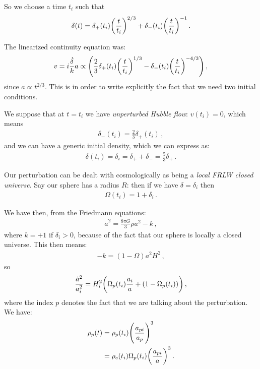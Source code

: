 \documentclass[main.tex]{subfiles}
\begin{document}
So we choose a time \(t_i\) such that 
%
\begin{align}
\delta (t) = \delta_+ (t_i) \qty(\frac{t}{t_i})^{2/3}
+ \delta_- (t_i) \qty(\frac{t}{t_i})^{-1}
\,.
\end{align}

The linearized continuity equation was: 
%
\begin{align}
v = i \frac{ \dot{\delta}}{k} a 
\propto \qty(\frac{2}{3} \delta_{+} (t_i) \qty(\frac{t}{t_i})^{1/3} - \delta_{-} (t_i) \qty(\frac{t}{t_i})^{-4/3})
\,,
\end{align}
%
since \(a \propto t^{2/3}\). This is in order to write explicitly the fact that we need two initial conditions. 

We suppose that at \(t=t_i\) we have \emph{unperturbed Hubble flow}: \(v(t_i) = 0\), which means 
%
\begin{align}
\delta_{-} (t_i) = \frac{2}{3} \delta_{+}(t_i)
\,,
\end{align}
%
and we can have a generic initial density, which we can express as: 
%
\begin{align}
\delta (t_i) = \delta_{i} = \delta_{+} + \delta_{-} = \frac{5}{3} \delta_{+} 
\,.
\end{align}

Our perturbation can be dealt with cosmologically as being a \emph{local FRLW closed universe}. 
Say our sphere has a radius \(R\): then if we have \( \delta = \delta_i\) then 
%
\begin{align}
\Omega (t_i) = 1 + \delta_{i}
\,.
\end{align}

We have then, from the Friedmann equations: 
%
\begin{align}
\dot{a}^2 = \frac{8 \pi G}{3} \rho a^2 - k 
\,,
\end{align}
%
where \(k = +1\) if \(\delta_{i} > 0\), because of the fact that our sphere is locally a closed universe. 
This then means: 
%
\begin{align}
- k = (1 - \Omega ) a^2 H^2
\,,
\end{align}
%
so 
%
\begin{align}
\frac{\dot{a}^2 }{a_i^2} = H_i^2 \qty(
    \Omega_{p} (t_i) \frac{a_i}{a} + (1 - \Omega_{p}(t_i))
)
\,,
\end{align}
%
where the index \(p\) denotes the fact that we are talking about the perturbation. We have: 
%
\begin{subequations}
\begin{align}
\rho_{p} (t) &= \rho_{p}(t_i) \qty(\frac{a_{pi}}{a_p})^3  \\
&= \rho_{c} (t_i) \Omega_{p} (t_i) \qty(\frac{a_{pi}}{a})^3
\,.
\end{align}
\end{subequations}
\end{document}
